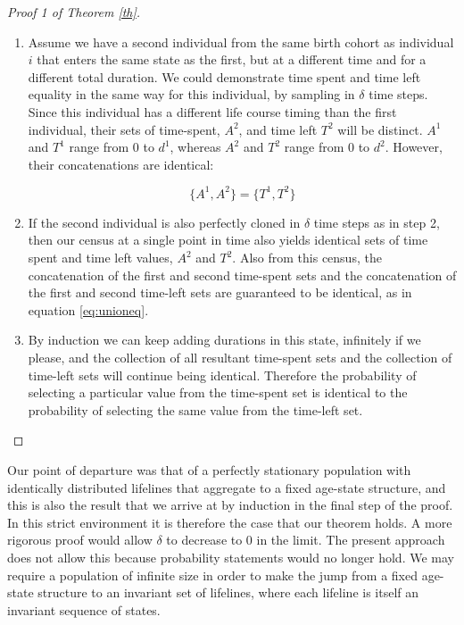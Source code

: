 \documentclass[12pt,oneside,a4paper]{article}
\theoremstyle{definition}
\begin{document}
\begin{proof}[Proof 1 of Theorem \ref{th}]
\begin{enumerate}
\FloatBarrier
\item{} Assume we have a second individual from the same birth cohort as
individual $i$ that enters the same state as the first, but at a different time
and for a different total duration. We could demonstrate time spent and time left equality in the same
way for this individual, by sampling in $\delta$ time steps. Since
this individual has a different life course timing than the first individual, their
sets of time-spent, $A^2$, and time left $T^2$ will be distinct. $A^1$ and $T^1$ range from 0 to $d^1$, whereas $A^2$ and $T^2$
range from 0 to $d^2$. However, their concatenations are identical:

\begin{equation}
\label{eq:unioneq}
\{A^1 , A^2\} = \{T^1 , T^2\}
\end{equation}

\item{} If the second individual is also perfectly cloned in $\delta$ time
steps as in step 2, then our census at a single point in time also
yields identical sets of time spent and time left values, $A^2$ and $T^2$. Also
from this census, the concatenation of the first and second time-spent sets and the concatenation of the first and second time-left sets
are guaranteed to be identical, as in equation \eqref{eq:unioneq}. 

\item{} By induction we can keep adding durations in this state, infinitely if we
please, and the collection of all resultant time-spent sets and the collection
of time-left sets will continue being identical. Therefore the probability of selecting a particular value from the time-spent set is identical
to the probability of selecting the same value from the time-left set. 
\end{enumerate}
\end{proof}

Our point of departure was that of a perfectly stationary population with
identically distributed lifelines that aggregate to a fixed age-state structure,
and this is also the result that we arrive at by induction in the final step of
the proof. In this strict environment it is therefore the case that our theorem
holds. A more rigorous proof would allow $\delta$ to decrease to 0 in the
limit. The present approach does not allow this because probability statements
would no longer hold. We may require a population of infinite size in order to
make the jump from a fixed age-state structure to an invariant set of lifelines,
where each lifeline is itself an invariant sequence of states. 
\end{document}
